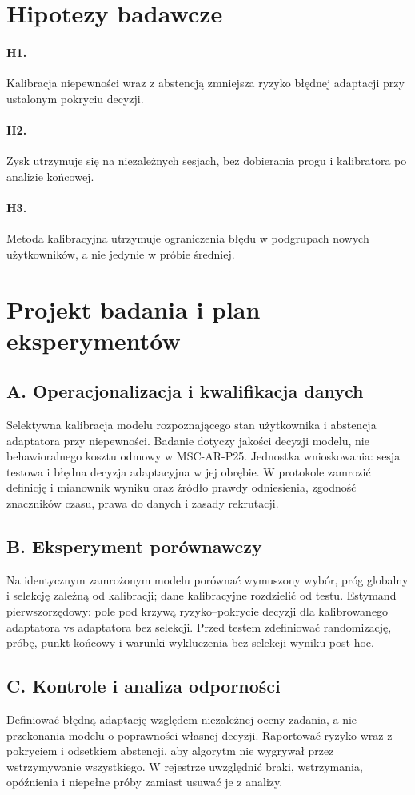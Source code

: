 \documentclass[11pt,a4paper]{article}
\begin{document}
\section{Hipotezy badawcze}
\paragraph{H1.} Kalibracja niepewności wraz z abstencją zmniejsza ryzyko błędnej adaptacji przy ustalonym pokryciu decyzji.
\paragraph{H2.} Zysk utrzymuje się na niezależnych sesjach, bez dobierania progu i kalibratora po analizie końcowej.
\paragraph{H3.} Metoda kalibracyjna utrzymuje ograniczenia błędu w podgrupach nowych użytkowników, a nie jedynie w próbie średniej.
\section{Projekt badania i plan eksperymentów}
\subsection{A. Operacjonalizacja i kwalifikacja danych}
Selektywna kalibracja modelu rozpoznającego stan użytkownika i abstencja adaptatora przy niepewności. Badanie dotyczy jakości decyzji modelu, nie behawioralnego kosztu odmowy w MSC-AR-P25. Jednostka wnioskowania: sesja testowa i błędna decyzja adaptacyjna w jej obrębie. W protokole zamrozić definicję i mianownik wyniku oraz źródło prawdy odniesienia, zgodność znaczników czasu, prawa do danych i zasady rekrutacji.
\subsection{B. Eksperyment porównawczy}
Na identycznym zamrożonym modelu porównać wymuszony wybór, próg globalny i selekcję zależną od kalibracji; dane kalibracyjne rozdzielić od testu. Estymand pierwszorzędowy: pole pod krzywą ryzyko–pokrycie decyzji dla kalibrowanego adaptatora vs adaptatora bez selekcji. Przed testem zdefiniować randomizację, próbę, punkt końcowy i warunki wykluczenia bez selekcji wyniku post hoc.
\subsection{C. Kontrole i analiza odporności}
Definiować błędną adaptację względem niezależnej oceny zadania, a nie przekonania modelu o poprawności własnej decyzji. Raportować ryzyko wraz z pokryciem i odsetkiem abstencji, aby algorytm nie wygrywał przez wstrzymywanie wszystkiego. W rejestrze uwzględnić braki, wstrzymania, opóźnienia i niepełne próby zamiast usuwać je z analizy.
\end{document}

